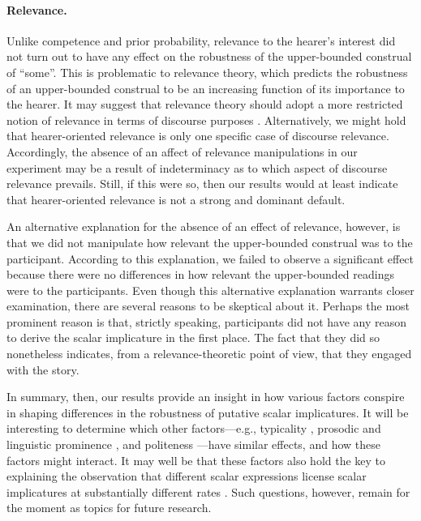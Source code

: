 \documentclass[12pt]{article}
\begin{document}
\paragraph{Relevance.} Unlike competence and prior probability, relevance to the hearer's
interest did not turn out to have any effect on the robustness of the upper-bounded construal
of ``some''. This is problematic to relevance theory, which predicts the robustness of an
upper-bounded construal to be an increasing function of its importance to the hearer. It may
suggest that relevance theory should adopt a more restricted notion of relevance in terms of
discourse purposes \citep{cummins2015}. Alternatively, we might hold that hearer-oriented
relevance is only one specific case of discourse relevance. Accordingly, the absence of an
affect of relevance manipulations in our experiment may be a result of indeterminacy as to
which aspect of discourse relevance prevails. Still, if this were so, then our results would at
least indicate that hearer-oriented relevance is not a strong and dominant default.

An alternative explanation for the absence of an effect of relevance, however, is that
we did not manipulate how relevant the upper-bounded construal was to the
participant. According to this explanation, we failed to observe a significant effect because
there were no differences in how relevant the upper-bounded readings were to the
participants. Even though this alternative explanation warrants closer examination, there are
several reasons to be skeptical about it. Perhaps the most prominent reason is that, strictly
speaking, participants did not have any reason to derive the scalar implicature in the first
place. The fact that they did so nonetheless indicates, from a relevance-theoretic point of view,
that they engaged with the story.

In summary, then, our results provide an insight in how various factors conspire in shaping
differences in the robustness of putative scalar implicatures. It will be interesting to
determine which other factors---e.g., typicality \citep{tiel2013}, prosodic and linguistic
prominence \citep{breheny2006}, and politeness \citep{bonnefon2009}---have similar effects, and
how these factors might interact. It may well be that these factors also hold the key to
explaining the observation that different scalar expressions license scalar implicatures at
substantially different rates \citep{tiel2016}. Such questions, however, remain for the moment
as topics for future research.
\end{document}
